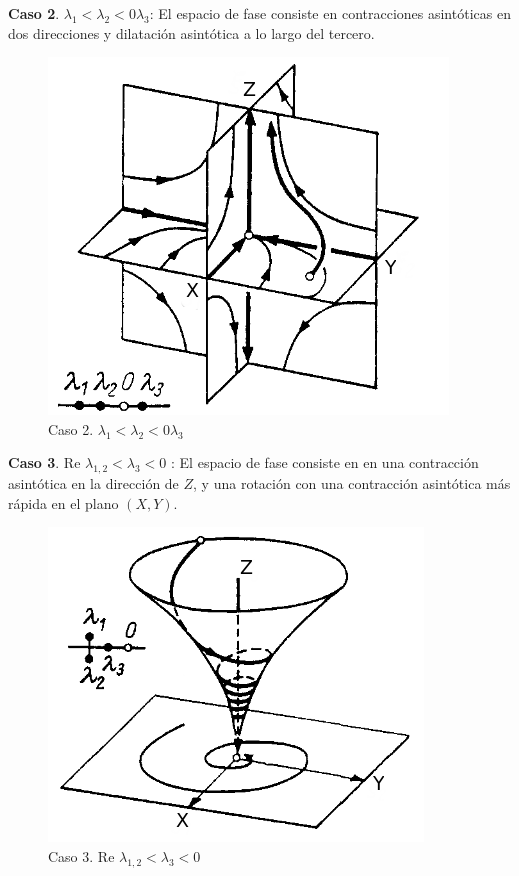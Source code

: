 \documentclass[a4paper,10pt]{article}
\numberwithin{equation}{section}
\begin{document}
\textbf{Caso 2}. $\lambda_1 < \lambda_2 < 0 \lambda_3$: El espacio de fase consiste en contracciones asintóticas
en dos direcciones y dilatación asintótica a lo largo del tercero.

\begin{figure}[H]
 \centering
\includegraphics[scale=0.35]{problema3fig3}
\caption{Caso 2. $\lambda_1 < \lambda_2 < 0 \lambda_3$}
\label{fig:problema3fig3}
\end{figure}
\vspace{.3cm}

\textbf{Caso 3}. Re $\lambda_{1,2} < \lambda_3 < 0$ : El espacio de fase consiste en en una contracción asintótica
en la dirección de $Z$, y una rotación con una contracción asintótica más rápida en el plano
$(X,Y)$.

\begin{figure}[H]
 \centering
\includegraphics[scale=0.35]{problema3fig4}
\caption{Caso 3. Re $\lambda_{1,2} < \lambda_3 < 0$}
\label{fig:problema3fig4}
\end{figure}
\vspace{.3cm}
\end{document}
